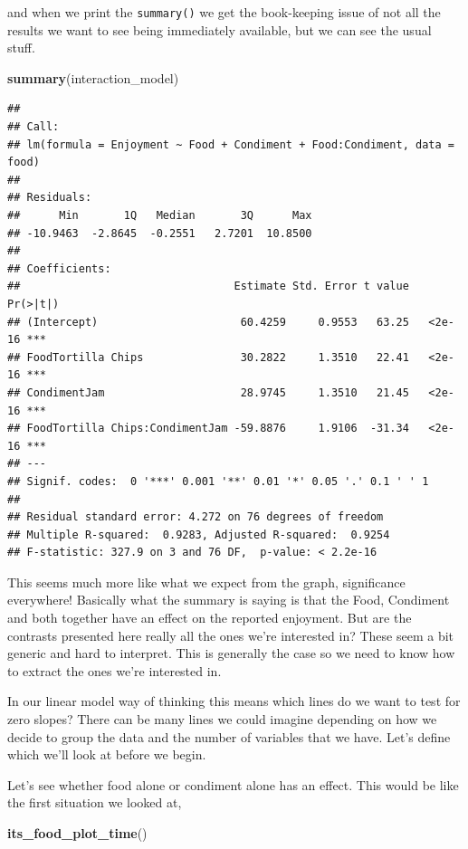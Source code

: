 \documentclass[
]{book}
\newenvironment{Shaded}{\begin{snugshade}}{\end{snugshade}}
\newcommand{\KeywordTok}[1]{\textcolor[rgb]{0.13,0.29,0.53}{\textbf{#1}}}
\newcommand{\NormalTok}[1]{#1}
\begin{document}
and when we print the \texttt{summary()} we get the book-keeping issue of not all the results we want to see being immediately available, but we can see the usual stuff.

\begin{Shaded}
\begin{Highlighting}[]
\KeywordTok{summary}\NormalTok{(interaction_model)}
\end{Highlighting}
\end{Shaded}

\begin{verbatim}
## 
## Call:
## lm(formula = Enjoyment ~ Food + Condiment + Food:Condiment, data = food)
## 
## Residuals:
##      Min       1Q   Median       3Q      Max 
## -10.9463  -2.8645  -0.2551   2.7201  10.8500 
## 
## Coefficients:
##                                 Estimate Std. Error t value Pr(>|t|)    
## (Intercept)                      60.4259     0.9553   63.25   <2e-16 ***
## FoodTortilla Chips               30.2822     1.3510   22.41   <2e-16 ***
## CondimentJam                     28.9745     1.3510   21.45   <2e-16 ***
## FoodTortilla Chips:CondimentJam -59.8876     1.9106  -31.34   <2e-16 ***
## ---
## Signif. codes:  0 '***' 0.001 '**' 0.01 '*' 0.05 '.' 0.1 ' ' 1
## 
## Residual standard error: 4.272 on 76 degrees of freedom
## Multiple R-squared:  0.9283,	Adjusted R-squared:  0.9254 
## F-statistic: 327.9 on 3 and 76 DF,  p-value: < 2.2e-16
\end{verbatim}

This seems much more like what we expect from the graph, significance everywhere! Basically what the summary is saying is that the Food, Condiment and both together have an effect on the reported enjoyment. But are the contrasts presented here really all the ones we're interested in? These seem a bit generic and hard to interpret. This is generally the case so we need to know how to extract the ones we're interested in.

In our linear model way of thinking this means which lines do we want to test for zero slopes? There can be many lines we could imagine depending on how we decide to group the data and the number of variables that we have. Let's define which we'll look at before we begin.

Let's see whether food alone or condiment alone has an effect. This would be like the first situation we looked at,

\begin{Shaded}
\begin{Highlighting}[]
\KeywordTok{its_food_plot_time}\NormalTok{()}
\end{Highlighting}
\end{Shaded}
\end{document}
